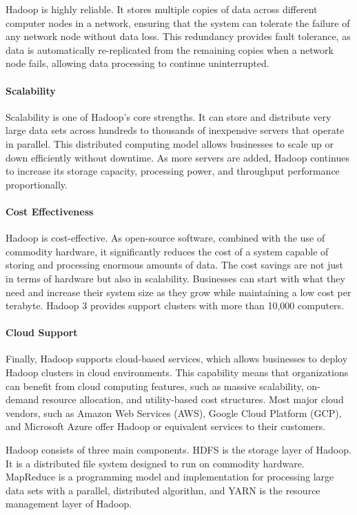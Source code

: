 Hadoop is highly reliable. It stores multiple copies of data across different computer nodes in a network, ensuring that the system can tolerate the failure of any network node without data loss. This redundancy provides fault tolerance, as data is automatically re-replicated from the remaining copies when a network node fails, allowing data processing to continue uninterrupted.

\paragraph*{Scalability}

Scalability is one of Hadoop's core strengths. It can store and distribute very large data sets across hundreds to thousands of inexpensive servers that operate in parallel. This distributed computing model allows businesses to scale up or down efficiently without downtime. As more servers are added, Hadoop continues to increase its storage capacity, processing power, and throughput performance proportionally.

\paragraph*{Cost Effectiveness}

Hadoop is cost-effective. As open-source software, combined with the use of commodity hardware, it significantly reduces the cost of a system capable of storing and processing enormous amounts of data. The cost savings are not just in terms of hardware but also in scalability. Businesses can start with what they need and increase their system size as they grow while maintaining a low cost per terabyte. Hadoop 3 provides support clusters with more than 10,000 computers.

\paragraph*{Cloud Support}

Finally, Hadoop supports cloud-based services, which allows businesses to deploy Hadoop clusters in cloud environments. This capability means that organizations can benefit from cloud computing features, such as massive scalability, on-demand resource allocation, and utility-based cost structures. Most major cloud vendors, such as Amazon Web Services (AWS), Google Cloud Platform (GCP), and Microsoft Azure offer Hadoop or equivalent services to their customers.

Hadoop consists of three main components. HDFS is the storage layer of Hadoop. It is a distributed file system designed to run on commodity hardware. MapReduce is a programming model and implementation for processing large data sets with a parallel, distributed algorithm, and YARN is the resource management layer of Hadoop. 

